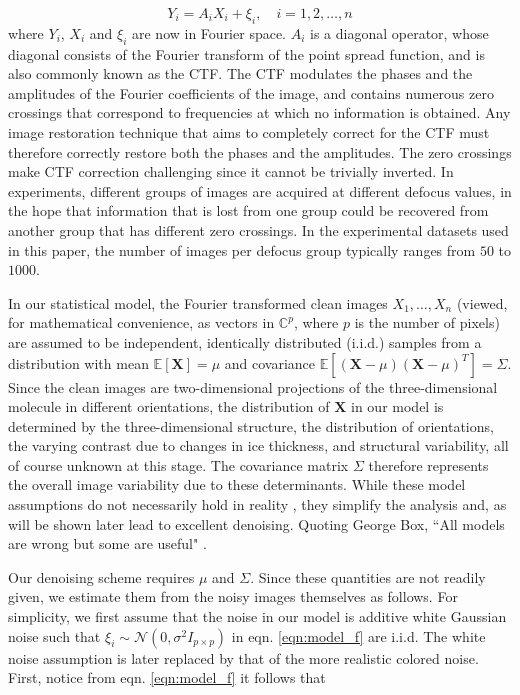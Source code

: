 \begin{equation}
 Y_i = A_i X_i + \xi_i, \quad i=1,2,\ldots,n
\label{eqn:model_f}
\end{equation}
where $Y_i$, $X_i$ and $\xi_i$ are now in Fourier space. $A_i$ is 
a diagonal operator, whose diagonal consists of
the Fourier transform of the point spread function,
and is also commonly known as the CTF. The CTF modulates the
phases and the amplitudes of the Fourier coefficients of the image, and contains
numerous zero crossings that correspond
to frequencies at which no information is obtained.
Any image restoration technique that aims to completely correct for the CTF
must therefore correctly restore both the phases and the amplitudes.
The zero crossings make CTF correction
challenging since it cannot be trivially inverted. 
In experiments, different
groups of images are acquired at different defocus values, in the hope that 
information that is lost from one group could be
recovered from another group that has different zero crossings. In the experimental
datasets used in this paper, the number of images per defocus group typically ranges from 
$50$ to $1000$.

In our statistical model, the Fourier transformed clean images $X_1,\dots,X_n$ 
(viewed, for mathematical convenience, as vectors in $\mathbb{C}^p$, where $p$ is the number of pixels) 
are assumed to be independent,
identically distributed (i.i.d.) samples from a distribution with mean $\mathbb{E}[\textbf{X}]=\mu$
and covariance $\mathbb{E}[(\textbf{X}-\mu)(\textbf{X}-\mu)^T]=\Sigma$. 
Since the clean images are two-dimensional projections of the three-dimensional molecule in different orientations, 
the distribution of $\textbf{X}$ in our model is determined by the three-dimensional structure, the distribution of orientations, 
the varying contrast due to changes in ice thickness, and structural variability, all of course unknown at this stage. 
The covariance matrix $\Sigma$ therefore represents the overall image variability due to these determinants.
While these model assumptions do not necessarily hold in reality \cite{sorzano1, sorzano2}, they simplify the analysis and, as will be shown later lead to excellent denoising.
Quoting George Box, ``All models are wrong but some are useful" \cite{box}.

Our denoising scheme requires $\mu$ and
$\Sigma$. Since these quantities are not readily given, we estimate them from the noisy images themselves as follows.
For simplicity, we first assume that the noise in our model is additive 
white
Gaussian noise such that $\xi_i \sim \mathcal{N} (0,\sigma^2 I_{p \times p})$ 
in eqn. \ref{eqn:model_f} are i.i.d. The white noise assumption is later replaced by that 
of the more realistic colored noise. First, notice from eqn. \ref{eqn:model_f} it follows that

